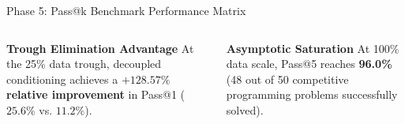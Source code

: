 \documentclass[aspectratio=169,10pt]{beamer}
\begin{document}
\begin{frame}{Phase 5: Pass@k Benchmark Performance Matrix}
  \begin{table}[h]
    \centering
    \scriptsize
    \caption{Pass@k Evaluation on 50 Test Problems ($k=5$ samples, $N_{\text{eval}}=250$ executions per checkpoint; 2,000 runs total)}
  \end{table}

  \begin{columns}[T]
    \begin{column}{0.48\textwidth}
      \begin{block}{\textbf{Trough Elimination Advantage}}
        \footnotesize
        At the 25\% data trough, decoupled conditioning achieves a \textbf{$+128.57\%$ relative improvement} in Pass@1 ($25.6\%$ vs. $11.2\%$).
      \end{block}
    \end{column}
    \begin{column}{0.48\textwidth}
      \begin{exampleblock}{\textbf{Asymptotic Saturation}}
        \footnotesize
        At 100\% data scale, Pass@5 reaches \textbf{96.0\%} (48 out of 50 competitive programming problems successfully solved).
      \end{exampleblock}
    \end{column}
  \end{columns}
\end{frame}
\end{document}
